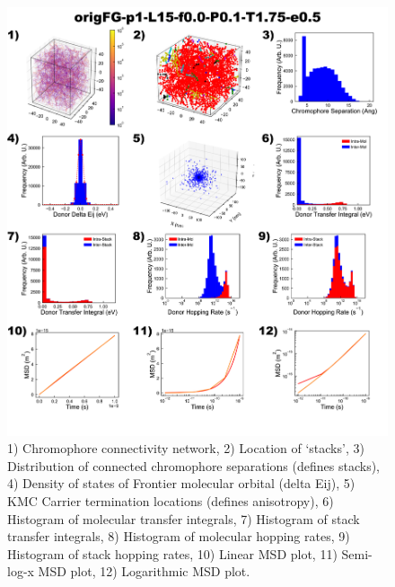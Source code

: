 \documentclass[12pt]{article}
\begin{document}
\begin{figure}[h]\centering
	\includegraphics[width=\textwidth]{Figures/origFG-p1-L15-f0.0-P0.1-T1.75-e0.5.png}
    \caption{   1) Chromophore connectivity network, 
                2) Location of `stacks', 
                3) Distribution of connected chromophore separations (defines stacks),
                4) Density of states of Frontier molecular orbital (delta Eij),
                5) KMC Carrier termination locations (defines anisotropy),
                6) Histogram of molecular transfer integrals,
                7) Histogram of stack transfer integrals,
                8) Histogram of molecular hopping rates,
                9) Histogram of stack hopping rates,
                10) Linear MSD plot,
                11) Semi-log-x MSD plot,
                12) Logarithmic MSD plot.}
	\label{fig:UneqlT1.75}
\end{figure}
\end{document}
